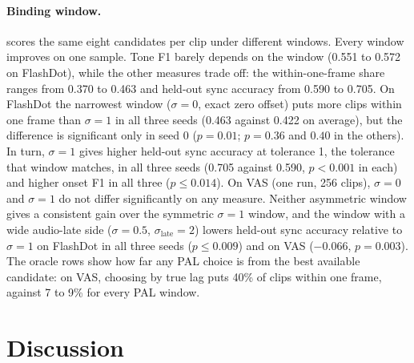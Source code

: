 \paragraph{Binding window.}  scores the same eight candidates per clip under different windows. Every window improves on one sample. Tone F1 barely depends on the window (0.551 to 0.572 on FlashDot), while the other measures trade off: the within-one-frame share ranges from 0.370 to 0.463 and held-out sync accuracy from 0.590 to 0.705. On FlashDot the narrowest window ($\sigma = 0$, exact zero offset) puts more clips within one frame than $\sigma = 1$ in all three seeds (0.463 against 0.422 on average), but the difference is significant only in seed 0 ($p = 0.01$; $p = 0.36$ and $0.40$ in the others). In turn, $\sigma = 1$ gives higher held-out sync accuracy at tolerance 1, the tolerance that window matches, in all three seeds (0.705 against 0.590, $p < 0.001$ in each) and higher onset F1 in all three ($p \le 0.014$). On VAS (one run, 256 clips), $\sigma = 0$ and $\sigma = 1$ do not differ significantly on any measure. Neither asymmetric window gives a consistent gain over the symmetric $\sigma = 1$ window, and the window with a wide audio-late side ($\sigma = 0.5$, $\sigma_{\mathrm{late}} = 2$) lowers held-out sync accuracy relative to $\sigma = 1$ on FlashDot in all three seeds ($p \le 0.009$) and on VAS ($-0.066$, $p = 0.003$). The oracle rows show how far any PAL choice is from the best available candidate: on VAS, choosing by true lag puts 40\% of clips within one frame, against 7 to 9\% for every PAL window.

\section{Discussion}
\label{sec:discussion}

